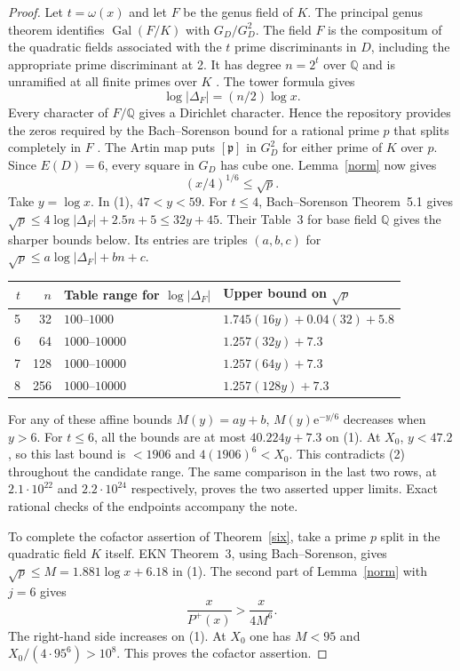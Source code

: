\documentclass[11pt]{article}
\newcommand{\heading}[1]{\par\noindent{\large\bfseries\color{ink}#1}\par\smallskip}
\newcommand{\QQ}{\mathbb Q}
\newcommand{\e}{\mathrm e}
\begin{document}
\begin{proof}
Let $t=\omega(x)$ and let $F$ be the genus field of $K$. The principal genus theorem identifies $\operatorname{Gal}(F/K)$ with $G_D/G_D^2$. The field $F$ is the compositum of the quadratic fields associated with the $t$ prime discriminants in $D$, including the appropriate prime discriminant at 2. It has degree $n=2^t$ over $\QQ$ and is unramified at all finite primes over $K$ \cite{cox}. The tower formula gives
\[
                    \log |\Delta_F|=(n/2)\log x .
\]
Every character of $F/\QQ$ gives a Dirichlet character. Hence the repository provides the zeros required by the Bach--Sorenson bound for a rational prime $p$ that splits completely in $F$ \cite{bach}. The Artin map puts $[\mathfrak p]$ in $G_D^2$ for either prime of $K$ over $p$. Since $E(D)=6$, every square in $G_D$ has cube one. Lemma~\ref{norm} now gives
\begin{equation}
                         (x/4)^{1/6}\le\sqrt p.                  \tag{2}
\end{equation}
Take $y=\log x$. In (1), $47<y<59$. For $t\le4$, Bach--Sorenson Theorem~5.1 gives $\sqrt p\le4\log|\Delta_F|+2.5n+5\le32y+45$. Their Table~3 for base field $\QQ$ gives the sharper bounds below. Its entries are triples $(a,b,c)$ for $\sqrt p\le a\log|\Delta_F|+bn+c$.

\begin{center}\small
\begin{tabular}{r r l l}\toprule
$t$ & $n$ & Table range for $\log|\Delta_F|$ & Upper bound on $\sqrt p$\\\midrule
5&32&$100$--$1000$ & $1.745(16y)+0.04(32)+5.8$\\
6&64&$1000$--$10000$ & $1.257(32y)+7.3$\\
7&128&$1000$--$10000$ & $1.257(64y)+7.3$\\
8&256&$1000$--$10000$ & $1.257(128y)+7.3$\\\bottomrule
\end{tabular}\end{center}
For any of these affine bounds $M(y)=ay+b$, $M(y)\e^{-y/6}$ decreases when $y>6$. For $t\le6$, all the bounds are at most $40.224y+7.3$ on (1). At $X_0$, $y<47.2$, so this last bound is $<1906$ and $4(1906)^6<X_0$. This contradicts (2) throughout the candidate range. The same comparison in the last two rows, at $2.1\cdot10^{22}$ and $2.2\cdot10^{24}$ respectively, proves the two asserted upper limits. Exact rational checks of the endpoints accompany the note.

\newpage
\heading{The cofactor restriction and the exact counts}
To complete the cofactor assertion of Theorem~\ref{six}, take a prime $p$ split in the quadratic field $K$ itself. EKN Theorem~3, using Bach--Sorenson, gives $\sqrt p\le M=1.881\log x+6.18$ in (1). The second part of Lemma~\ref{norm} with $j=6$ gives
\[
                    \frac{x}{P^+(x)}>\frac{x}{4M^6}.
\]
The right-hand side increases on (1). At $X_0$ one has $M<95$ and $X_0/(4\cdot95^6)>10^8$. This proves the cofactor assertion.
\end{proof}
\end{document}

